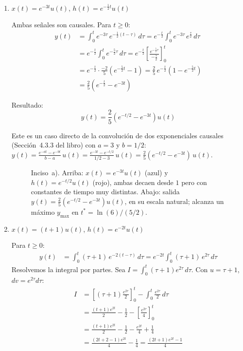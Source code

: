 \documentclass[10pt,a4paper]{article}
\begin{document}
	\begin{enumerate}[label=\textbf{\alph*)}]
		\item $x(t)=e^{-3t}u(t)$, $h(t)=e^{-\frac{1}{2}t}u(t)$
		
		Ambas señales son causales. Para $t \geq 0$:
		\begin{align*}
		y(t) &= \int_0^t e^{-3\tau}\,e^{-\frac{1}{2}(t-\tau)}\,d\tau = e^{-\frac{t}{2}}\int_0^t e^{-3\tau}\,e^{\frac{\tau}{2}}\,d\tau \\
		&= e^{-\frac{t}{2}}\int_0^t e^{-\frac{5}{2}\tau}\,d\tau = e^{-\frac{t}{2}}\left[\frac{e^{-\frac{5}{2}\tau}}{-\frac{5}{2}}\right]_0^t \\
		&= e^{-\frac{t}{2}}\cdot\frac{-2}{5}\left(e^{-\frac{5}{2}t} - 1\right) = \frac{2}{5}\,e^{-\frac{t}{2}}\left(1 - e^{-\frac{5}{2}t}\right) \\
		&= \frac{2}{5}\left(e^{-\frac{t}{2}} - e^{-3t}\right)
		\end{align*}
		
		Resultado:
		\[
		\boxed{y(t) = \frac{2}{5}\left(e^{-t/2} - e^{-3t}\right)u(t)}
		\]
		
		Este es un caso directo de la convolución de dos exponenciales causales (Sección~4.3.3 del libro) con $a=3$ y $b=1/2$:
		$y(t) = \frac{e^{-at} - e^{-bt}}{b-a}\,u(t) = \frac{e^{-3t} - e^{-t/2}}{1/2 - 3}\,u(t) = \frac{2}{5}(e^{-t/2} - e^{-3t})\,u(t)$.
		
		\begin{figure}[H]
		\centering
		
		\caption{Inciso~a). Arriba:  $x(t) = e^{-3t}u(t)$ (azul) y $h(t) = e^{-t/2}u(t)$ (rojo), ambas decaen desde $1$ pero con constantes de tiempo muy distintas. Abajo: salida $y(t) = \tfrac{2}{5}(e^{-t/2}-e^{-3t})u(t)$, en su escala natural; alcanza un máximo $y_{\max}$ en $t^{*} = \ln(6)/(5/2)$.}
		\end{figure}
		
		\item $x(t)=(t+1)u(t)$, $h(t)=e^{-2t}u(t)$
		
		Para $t \geq 0$:
		\begin{align*}
		y(t) &= \int_0^t (\tau+1)\,e^{-2(t-\tau)}\,d\tau = e^{-2t}\int_0^t (\tau+1)\,e^{2\tau}\,d\tau
		\end{align*}
		Resolvemos la integral por partes. Sea $I = \int_0^t (\tau+1)e^{2\tau}\,d\tau$. Con $u = \tau+1$, $dv = e^{2\tau}d\tau$:
		\begin{align*}
		I &= \left[(\tau+1)\frac{e^{2\tau}}{2}\right]_0^t - \int_0^t \frac{e^{2\tau}}{2}\,d\tau \\
		&= \frac{(t+1)e^{2t}}{2} - \frac{1}{2} - \left[\frac{e^{2\tau}}{4}\right]_0^t \\
		&= \frac{(t+1)e^{2t}}{2} - \frac{1}{2} - \frac{e^{2t}}{4} + \frac{1}{4} \\
		&= \frac{(2t+2-1)e^{2t}}{4} - \frac{1}{4} = \frac{(2t+1)e^{2t} - 1}{4}
		\end{align*}
		

\end{enumerate}
\end{document}
